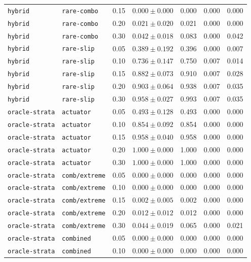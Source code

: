 \documentclass{article}
\begin{document}
\begin{center}
\begin{tabular}{lllcccc}
\texttt{hybrid} & \texttt{rare-combo} & 0.15 & $0.000 \pm 0.000$ & 0.000 & 0.000 & 0.000 \\
\texttt{hybrid} & \texttt{rare-combo} & 0.20 & $0.021 \pm 0.020$ & 0.021 & 0.000 & 0.000 \\
\texttt{hybrid} & \texttt{rare-combo} & 0.30 & $0.042 \pm 0.018$ & 0.083 & 0.000 & 0.042 \\
\texttt{hybrid} & \texttt{rare-slip} & 0.05 & $0.389 \pm 0.192$ & 0.396 & 0.000 & 0.007 \\
\texttt{hybrid} & \texttt{rare-slip} & 0.10 & $0.736 \pm 0.147$ & 0.750 & 0.007 & 0.014 \\
\texttt{hybrid} & \texttt{rare-slip} & 0.15 & $0.882 \pm 0.073$ & 0.910 & 0.007 & 0.028 \\
\texttt{hybrid} & \texttt{rare-slip} & 0.20 & $0.903 \pm 0.064$ & 0.938 & 0.007 & 0.035 \\
\texttt{hybrid} & \texttt{rare-slip} & 0.30 & $0.958 \pm 0.027$ & 0.993 & 0.007 & 0.035 \\
\texttt{oracle-strata} & \texttt{actuator} & 0.05 & $0.493 \pm 0.128$ & 0.493 & 0.000 & 0.000 \\
\texttt{oracle-strata} & \texttt{actuator} & 0.10 & $0.854 \pm 0.092$ & 0.854 & 0.000 & 0.000 \\
\texttt{oracle-strata} & \texttt{actuator} & 0.15 & $0.958 \pm 0.040$ & 0.958 & 0.000 & 0.000 \\
\texttt{oracle-strata} & \texttt{actuator} & 0.20 & $1.000 \pm 0.000$ & 1.000 & 0.000 & 0.000 \\
\texttt{oracle-strata} & \texttt{actuator} & 0.30 & $1.000 \pm 0.000$ & 1.000 & 0.000 & 0.000 \\
\texttt{oracle-strata} & \texttt{comb/extreme} & 0.05 & $0.000 \pm 0.000$ & 0.000 & 0.000 & 0.000 \\
\texttt{oracle-strata} & \texttt{comb/extreme} & 0.10 & $0.000 \pm 0.000$ & 0.000 & 0.000 & 0.000 \\
\texttt{oracle-strata} & \texttt{comb/extreme} & 0.15 & $0.002 \pm 0.005$ & 0.002 & 0.000 & 0.000 \\
\texttt{oracle-strata} & \texttt{comb/extreme} & 0.20 & $0.012 \pm 0.012$ & 0.012 & 0.000 & 0.000 \\
\texttt{oracle-strata} & \texttt{comb/extreme} & 0.30 & $0.044 \pm 0.019$ & 0.065 & 0.000 & 0.021 \\
\texttt{oracle-strata} & \texttt{combined} & 0.05 & $0.000 \pm 0.000$ & 0.000 & 0.000 & 0.000 \\
\texttt{oracle-strata} & \texttt{combined} & 0.10 & $0.000 \pm 0.000$ & 0.000 & 0.000 & 0.000 \\

\end{tabular}
\end{center}
\end{document}
